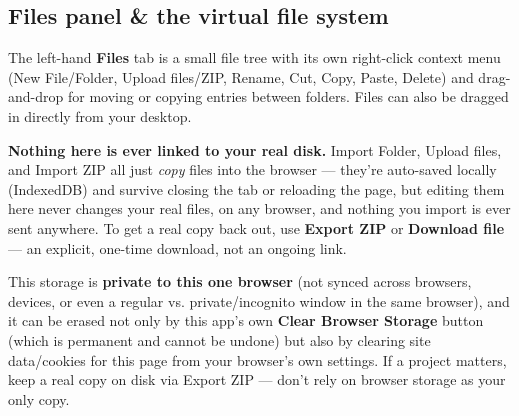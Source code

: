 \subsection*{Files panel \& the virtual file system}
The left-hand \textbf{Files} tab is a small file tree with its own right-click context menu (New File/Folder, Upload files/ZIP, Rename, Cut, Copy, Paste, Delete) and drag-and-drop for moving or copying entries between folders. Files can also be dragged in directly from your desktop.

\begin{tcolorbox}[colback=red!5!white,colframe=red!60!black,title=Warning]
\textbf{Nothing here is ever linked to your real disk.} Import Folder, Upload files, and Import ZIP all just \textit{copy} files into the browser — they're auto-saved locally (IndexedDB) and survive closing the tab or reloading the page, but editing them here never changes your real files, on any browser, and nothing you import is ever sent anywhere. To get a real copy back out, use \textbf{Export ZIP} or \textbf{Download file} — an explicit, one-time download, not an ongoing link.\par \par 
      This storage is \textbf{private to this one browser} (not synced across browsers, devices, or even a regular vs. private/incognito window in the same browser), and it can be erased not only by this app's own \textbf{Clear Browser Storage} button (which is permanent and cannot be undone) but also by clearing site data/cookies for this page from your browser's own settings. If a project matters, keep a real copy on disk via Export ZIP — don't rely on browser storage as your only copy.
    
\end{tcolorbox}